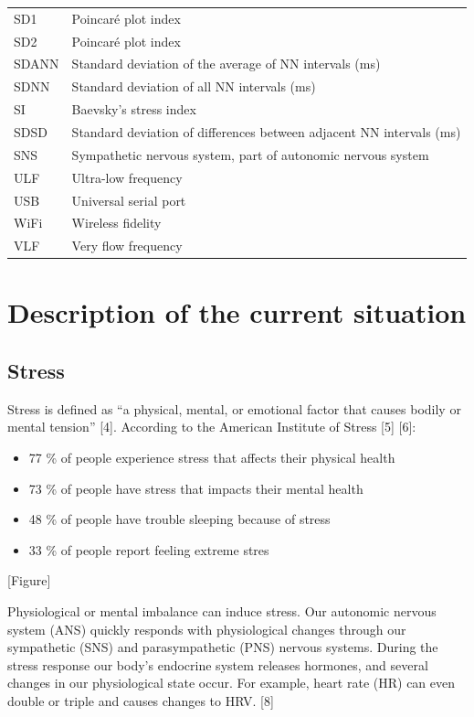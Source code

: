 \documentclass{article}
\begin{document}
\begin{table}[h]
{\begin{tabular}{p{2cm} p{9cm}}
SD1 & Poincaré plot index \\
SD2 & Poincaré plot index \\
SDANN & Standard deviation of the average of NN intervals (ms) \\
SDNN & Standard deviation of all NN intervals (ms) \\
SI & Baevsky’s stress index \\
SDSD & Standard deviation of differences between adjacent NN intervals (ms) \\
SNS & Sympathetic nervous system, part of autonomic nervous system \\
ULF & Ultra-low frequency \\
USB & Universal serial port \\
WiFi & Wireless fidelity \\
VLF & Very flow frequency \\
\end{tabular}
}
\end{table}

\pagebreak

\section{Description of the current situation}
\subsection{Stress}
Stress is defined as “a physical, mental, or emotional factor that causes bodily or mental
tension” [4]. According to the American Institute of Stress [5] [6]:

\begin{itemize}
\item 77 \% of people experience stress that affects their physical health
\item 73 \% of people have stress that impacts their mental health
\item 48 \% of people have trouble sleeping because of stress
\item 33 \% of people report feeling extreme stres
\end{itemize}

[Figure]

Physiological or mental imbalance can induce stress. Our autonomic nervous system (ANS)
quickly responds with physiological changes through our sympathetic (SNS) and
parasympathetic (PNS) nervous systems. During the stress response our body’s endocrine
system releases hormones, and several changes in our physiological state occur. For
example, heart rate (HR) can even double or triple and causes changes to HRV. [8]
\end{document}
